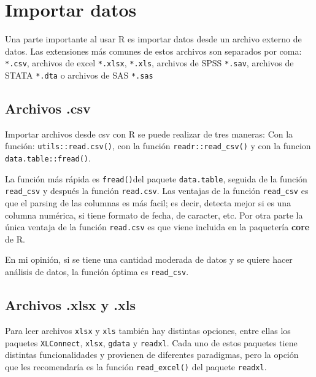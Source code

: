 \documentclass[]{book}
\begin{document}
\hypertarget{importar-datos}{%
\chapter{Importar datos}\label{importar-datos}}

Una parte importante al usar R es importar datos desde un archivo externo de datos. Las extensiones más comunes de estos archivos son separados por coma: \texttt{*.csv}, archivos de excel \texttt{*.xlsx}, \texttt{*.xls}, archivos de SPSS \texttt{*.sav}, archivos de STATA \texttt{*.dta} o archivos de SAS \texttt{*.sas}

\hypertarget{archivos-.csv}{%
\section{\texorpdfstring{Archivos \textbf{.csv}}{Archivos .csv}}\label{archivos-.csv}}

Importar archivos desde csv con R se puede realizar de tres maneras: Con la función: \texttt{utils::read.csv()}, con la función \texttt{readr::read\_csv()} y con la funcion \texttt{data.table::fread()}.

La función más rápida es \texttt{fread()}del paquete \texttt{data.table}, seguida de la función \texttt{read\_csv} y después la función \texttt{read.csv}. Las ventajas de la función \texttt{read\_csv} es que el parsing de las columnas es más facil; es decir, detecta mejor si es una columna numérica, si tiene formato de fecha, de caracter, etc. Por otra parte la única ventaja de la función \texttt{read.csv} es que viene incluida en la paquetería \textbf{core} de R.

En mi opinión, si se tiene una cantidad moderada de datos y se quiere hacer análisis de datos, la función óptima es \texttt{read\_csv}.

\hypertarget{archivos-.xlsx-y-.xls}{%
\section{\texorpdfstring{Archivos \textbf{.xlsx y .xls}}{Archivos .xlsx y .xls}}\label{archivos-.xlsx-y-.xls}}

Para leer archivos \texttt{xlsx} y \texttt{xls} también hay distintas opciones, entre ellas los paquetes \texttt{XLConnect}, \texttt{xlsx}, \texttt{gdata} y \texttt{readxl}. Cada uno de estos paquetes tiene distintas funcionalidades y provienen de diferentes paradigmas, pero la opción que les recomendaría es la función \texttt{read\_excel()} del paquete \texttt{readxl}.
\end{document}
